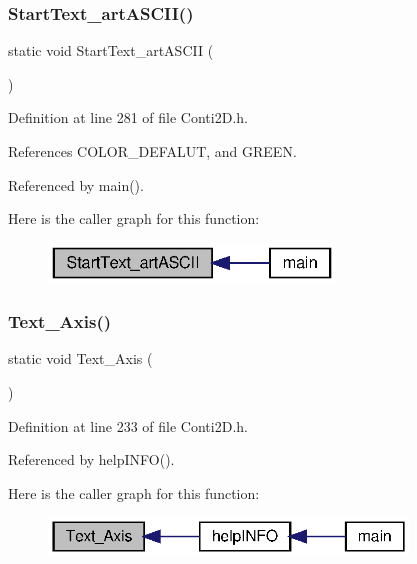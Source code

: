 \subsubsection{Start\+Text\+\_\+art\+A\+S\+C\+I\+I()}
{\footnotesize\ttfamily static void Start\+Text\+\_\+art\+A\+S\+C\+II (\begin{DoxyParamCaption}{ }\end{DoxyParamCaption})\hspace{0.3cm}{\ttfamily [static]}}



Definition at line 281 of file Conti2\+D.\+h.



References C\+O\+L\+O\+R\+\_\+\+D\+E\+F\+A\+L\+UT, and G\+R\+E\+EN.



Referenced by main().

Here is the caller graph for this function\+:\nopagebreak
\begin{figure}[H]
\begin{center}
\leavevmode
\includegraphics[width=216pt]{Conti2D_8h_a45d91f9b0b8852118211734681191355_a45d91f9b0b8852118211734681191355_icgraph}
\end{center}
\end{figure}
\mbox{\label{Conti2D_8h_a5721c5478e8afad6433cd59eae9b2d67_a5721c5478e8afad6433cd59eae9b2d67}} 
\subsubsection{Text\+\_\+\+Axis()}
{\footnotesize\ttfamily static void Text\+\_\+\+Axis (\begin{DoxyParamCaption}{ }\end{DoxyParamCaption})\hspace{0.3cm}{\ttfamily [static]}}



Definition at line 233 of file Conti2\+D.\+h.



Referenced by help\+I\+N\+F\+O().

Here is the caller graph for this function\+:\nopagebreak
\begin{figure}[H]
\begin{center}
\leavevmode
\includegraphics[width=271pt]{Conti2D_8h_a5721c5478e8afad6433cd59eae9b2d67_a5721c5478e8afad6433cd59eae9b2d67_icgraph}
\end{center}
\end{figure}
\mbox{\label{Conti2D_8h_a2418639857d09d54494ee0dc5fa8df78_a2418639857d09d54494ee0dc5fa8df78}} 
